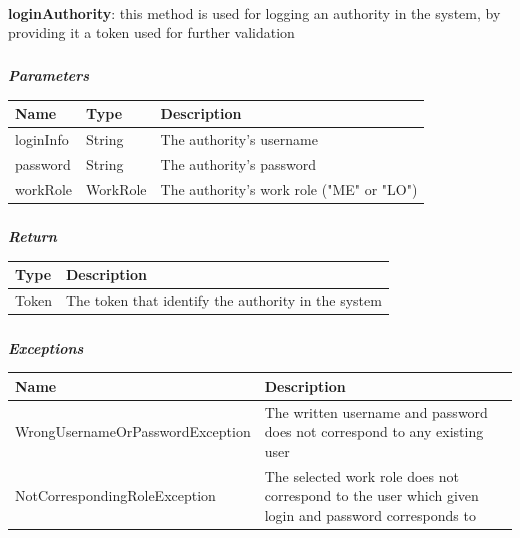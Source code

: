 					\paragraph{}
							\textbf{loginAuthority}: this method is used for logging an authority in the system, by providing it a token used for further validation
							\subparagraph{}
							\textit{\textbf{Parameters}}
								\begin{table}[!h]
									\begin{tabular}{L{0.2\textwidth}L{0.2\textwidth}L{0.2\textwidth}}
										\toprule
										Name & Type & Description \\
										\midrule
								  		loginInfo & String & The authority's username \\
								  		password & String & The authority's password \\
								  		workRole & WorkRole & The authority's work role ("ME" or "LO") \\
								 		\bottomrule
									\end{tabular}
								\end{table}
							\subparagraph{}
								\textit{\textbf{Return}}
									\begin{table}[!h]
									\begin{tabular}{L{0.3\textwidth}L{0.3\textwidth}}
										\toprule
										Type & Description \\
										\midrule
								  		Token & The token that identify the authority in the system \\
								 		\bottomrule
									\end{tabular}
								\end{table}
							\subparagraph{}
								\textit{\textbf{Exceptions}}
									\begin{table}[!h]
									\begin{tabular}{L{0.3\textwidth}L{0.3\textwidth}}
										\toprule
										Name & Description \\
										\midrule
								  	WrongUsernameOrPasswordException & The written username and password does not correspond to any existing user \\
								  	NotCorrespondingRoleException & The selected work role does not correspond to the user which given login and password corresponds to \\
								 		\bottomrule
									\end{tabular}
								\end{table}

